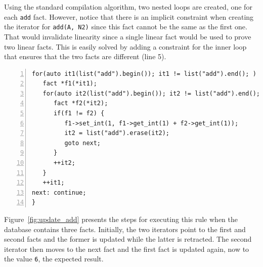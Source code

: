 Using the standard compilation algorithm, two nested loops are created, one for
each \texttt{add} fact. However, notice that there is an implicit constraint
when creating the iterator for \texttt{add(A, N2)} since this fact cannot be the
same as the first one. That would invalidate linearity since a single linear
fact would be used to prove two linear facts. This is easily solved by adding a
constraint for the inner loop that ensures that the two facts are different
(line 5).

\begin{Verbatim}[numbers=left,fontsize=\scriptsize,xleftmargin=\codemargin]
for(auto it1(list("add").begin()); it1 != list("add").end(); ) {
   fact *f1(*it1);
   for(auto it2(list("add").begin()); it2 != list("add").end(); ) {
      fact *f2(*it2);
      if(f1 != f2) {
         f1->set_int(1, f1->get_int(1) + f2->get_int(1));
         it2 = list("add").erase(it2);
         goto next;
      }
      ++it2;
   }
   ++it1;
next: continue;
}
\end{Verbatim}

Figure~\ref{fig:update_add} presents the steps for executing this rule when the
database contains three facts.  Initially, the two iterators point to the first
and second facts and the former is updated while the latter is retracted. The
second iterator then moves to the next fact and the first fact is updated again,
now to the value \texttt{6}, the expected result.

